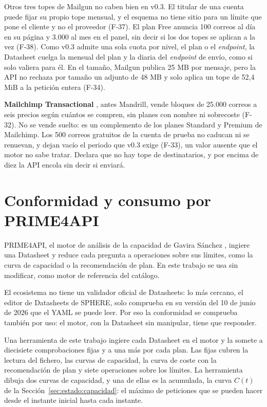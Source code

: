 Otros tres topes de Mailgun no caben bien en v0.3.
El titular de una cuenta puede fijar su propio tope mensual, y el esquema no tiene sitio para un límite que pone el cliente y no el proveedor (F-37).
El plan Free anuncia 100 correos al día en su página y 3.000 al mes en el panel, sin decir si los dos topes se aplican a la vez (F-38).
Como v0.3 admite una sola cuota por nivel, el plan o el \textit{endpoint}, la Datasheet cuelga la mensual del plan y la diaria del \textit{endpoint} de envío, como si solo valiera para él.
En el tamaño, Mailgun publica 25 MB por mensaje, pero la API no rechaza por tamaño un adjunto de 48 MB y solo aplica un tope de 52,4 MiB a la petición entera (F-34).

\textbf{Mailchimp Transactional} \citep{mailchimppricing}, antes Mandrill, vende bloques de 25.000 correos a seis precios según cuántos se compren, sin planes con nombre ni sobrecoste (F-32).
No se vende suelto: es un complemento de los planes Standard y Premium de Mailchimp.
Los 500 correos gratuitos de la cuenta de prueba no caducan ni se renuevan, y dejan vacío el periodo que v0.3 exige (F-33), un valor ausente que el motor no sabe tratar.
Declara que no hay tope de destinatarios, y por encima de diez la API encola sin decir si enviará.

\section{Conformidad y consumo por PRIME4API}
\label{sec:propuesta:prime4api}

PRIME4API, el motor de análisis de la capacidad de Gavira Sánchez \citep{gavira2026tfm,prime4apirepo}, ingiere una Datasheet y reduce cada pregunta a operaciones sobre sus límites, como la curva de capacidad o la recomendación de plan.
En este trabajo se usa sin modificar, como motor de referencia del catálogo.

El ecosistema no tiene un validador oficial de Datasheets: lo más cercano, el editor de Datasheets de SPHERE, solo comprueba en su versión del 10 de junio de 2026 que el YAML se puede leer.
Por eso la conformidad se comprueba también por uso: el motor, con la Datasheet sin manipular, tiene que responder.

Una herramienta de este trabajo ingiere cada Datasheet en el motor y la somete a diecisiete comprobaciones fijas y a una más por cada plan.
Las fijas cubren la lectura del fichero, las curvas de capacidad, la curva de coste con la recomendación de plan y siete operaciones sobre los límites.
La herramienta dibuja dos curvas de capacidad, y una de ellas es la acumulada, la curva $C(t)$ de la Sección~\ref{sec:estado:capacidad}: el máximo de peticiones que se pueden hacer desde el instante inicial hasta cada instante.

